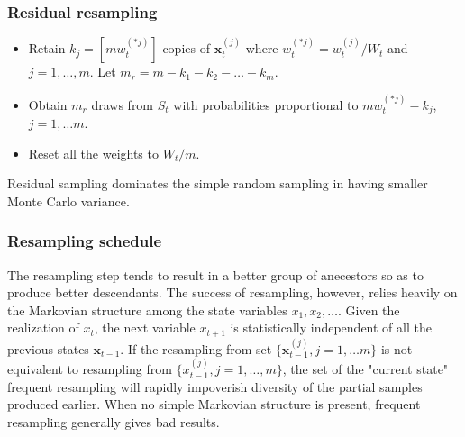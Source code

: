 \documentclass[times, utf8, diplomski]{fer}
\begin{document}
\subsubsection{Residual resampling}
\begin{itemize}
\item{Retain $k_j = [mw_t^{(*j)}]$ copies of $\mathbf{x}_t^{(j)}$ where $w_t^{(*j)} = w_t^{(j)} / W_t$ and $j = 1, \ldots, m$. Let $m_r = m - k_1 - k_2 - \ldots - k_m$.}
\item{Obtain $m_r$ draws from $S_t$ with probabilities proportional to $mw_t^{(*j)} - k_j$, $j = 1, \ldots m$.}
\item{Reset all the weights to $W_t / m$.}
\end{itemize}

Residual sampling dominates the simple random sampling in having smaller Monte Carlo variance. 


\subsubsection{Resampling schedule}
The resampling step tends to result in a better group of anecestors so  as to produce better descendants. The success of resampling, however, relies heavily on the Markovian structure among the state variables $x_1, x_2, \ldots$. Given the realization of $x_t$, the next variable $x_{t + 1}$ is statistically independent of all the previous states $\mathbf{x}_{t - 1}$. If the resampling from set $\{ \mathbf{x}_{t - 1}^{(j)}, j = 1, \ldots m\}$ is not equivalent to resampling from $\{ x_{t - 1}^{(j)}, j = 1, \ldots, m\}$, the set of the "current state" frequent resampling will rapidly impoverish diversity of the partial samples produced earlier. When no simple Markovian structure is present, frequent resampling generally gives bad results.
\end{document}
